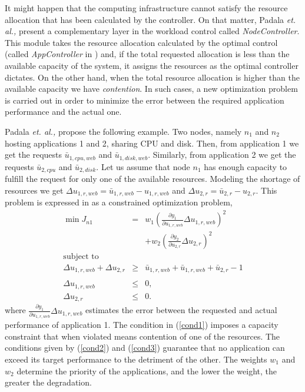 It might happen that the computing infrastructure cannot satisfy the resource allocation that has been calculated by the controller.
On that matter, Padala \emph{et. al.,} \cite{Padala-2009} present a complementary layer in the workload control called \emph{NodeController}. This module takes the resource 
allocation calculated by the optimal control (called \emph{AppController} in \cite{Padala-2009}) and, if the total requested allocation is less than the available 
capacity of the system, it assigns the resources as the optimal controller dictates. On the other hand, 
when the total resource allocation is higher than the available capacity we have  \emph{contention}. In such cases,
a new optimization problem is carried out in order to minimize the error between the required application performance and the 
actual one.

Padala \emph{et. al.,} \cite{Padala-2009} propose the following example. Two nodes, namely $n_{1}$ and $n_{2}$ hosting applications 1 and 2, sharing 
CPU and disk. Then, from application 1 we get the requests 
$\bar{u}_{1,cpu,web}$ and $\bar{u}_{1,disk,web}$.
Similarly, from application 2 we get the requests $\bar{u}_{2,cpu}$ and $\bar{u}_{2,disk}$.
Let us assume that node $n_{1}$ has enough capacity to fulfill the request for only one of the available resources. 
Modeling the shortage of resources we get $\Delta u_{1,r,web} = \bar{u}_{1,r,web}-u_{1,r,web}$ and 
$\Delta u_{2,r} = \bar{u}_{2,r}-u_{2,r}$. This problem is expressed in \cite{Padala-2009} as a constrained optimization problem,
\begin{eqnarray}
 \min J_{n1} & = & w_{1}\left(\frac{\partial y_{1}}{\partial u_{1,r,web}}\Delta u_{1,r,web} \right)^{2} \nonumber \\
 &&+
w_{2}\left(\frac{\partial y_{2}}{\partial u_{2,r}}\Delta u_{2,r} \right)^{2} \label{costn1} \\
\mbox{subject to} & & \nonumber \\
 \Delta u_{1,r,web} + \Delta u_{2,r} & \geq & \bar{u}_{1,r,web} + \bar{u}_{1,r,web} + \bar{u}_{2,r}-1 \nonumber \\
 \label{cond1} \\
\Delta u_{1,r,web} & \leq & 0, \label{cond2} \\
\Delta u_{2,r} & \leq & 0. \label{cond3}
\end{eqnarray}
where $\frac{\partial y_{1}}{\partial u_{1,r,web}}\Delta u_{1,r,web}$ estimates the error between the
requested and actual performance of application 1.
The condition in (\ref{cond1}) imposes a capacity constraint
that when violated means contention of one of the resources. The conditions given by (\ref{cond2}) and (\ref{cond3})
guarantee that no application can exceed its target performance to the detriment of the other.  
The weights $w_{1}$ and $w_{2}$ determine the priority of the applications, and the lower the weight, the greater the degradation.

